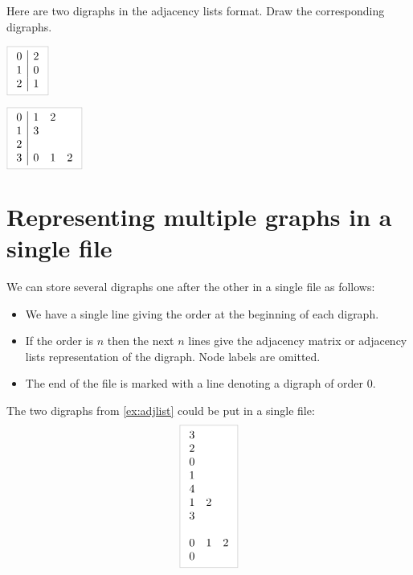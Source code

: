 \begin{Boxample}[0] \label{ex:adjlist}
Here are two digraphs in the adjacency lists format.  Draw the corresponding digraphs.

	\vspace{1cm}
	$\lightgraybox{\begin{array}{c|c}
	0 & 2  \\
	1 & 0  \\
	2 & 1 \\
	\end{array}}$
	
	\vspace{1.5cm}
	$\lightgraybox{\begin{array}{c|ccc}
	0 & 1 & 2  \\
	1 & 3  \\
	2  \\
	3 & 0 & 1 & 2 \\
	\end{array}}$
\end{Boxample}

\section{Representing multiple graphs in a single file}
We can store several digraphs one after the other in a single file as follows: 
\begin{itemize}
  \item We have a single line giving the order at the beginning of each digraph.
  \item If the order is $n$ then the next $n$ lines give the adjacency matrix 
  or adjacency lists representation of the digraph. Node labels are omitted.
  \item The end of the file is marked with a line denoting a digraph of order $0$.
\end{itemize}

\begin{Boxample} 
The two digraphs from \cref{ex:adjlist} could be put in a single file:
$$
\lightgraybox{
	\begin{array}{ccc}
	3 &   &   \\
	2 &   &   \\
	0 &   &   \\
	1 &   &   \\
	4 &   &   \\
	1 & 2 &   \\
	3 &   &   \\
	  &   &   \\
	0 & 1 &  2 \\
	0 &   &   \\
	\end{array}
}
$$
\end{Boxample}


